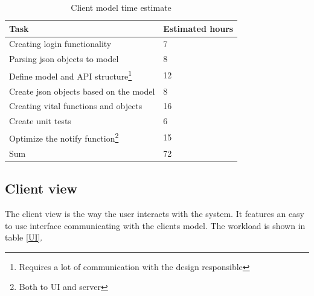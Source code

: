 \documentclass[a4paper, english, 12pt]{article}
\begin{document}
 \begin{table}[h!]
    \begin{center}
    \caption{Client model time estimate} 
    \label{clientmodel}
    \vspace{0,5cm}
    \begin{tabular}{ll} \\ 
        \hline
        Task & Estimated hours\\
        \hline 
    Creating login functionality & 7 \\
    Parsing json objects to model & 8 \\
    Define model and API structure\footnote{Requires a lot of communication with the design responsible}  & 12\\
    Create json objects based on the model & 8 \\
    Creating vital functions and objects & 16 \\
    Create unit tests & 6 \\
    Optimize the notify function\footnote{Both to UI and server} & 15 \\    
        \hline
    Sum & 72\\
    \hline
    \end{tabular}
    \end{center}
\end{table}



\subsection{Client view}
The client view is the way the user interacts with the system. It features an easy to use interface communicating with the clients model. The workload is shown in table \ref{UI}.
\end{document}
